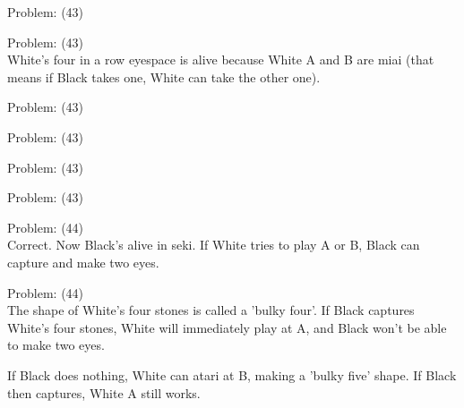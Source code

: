 \documentclass[11pt]{article}
\begin{document}
\begin{minipage}[t]{0.5\textwidth}
  {\centering
  
Problem: (43)\\
  }
\end{minipage}
\begin{minipage}[t]{0.5\textwidth}
  {\centering
  
Problem: (43)\\
White's four in a row eyespace is alive because White A and B are miai (that means if Black takes one, White can take the other one).\\
  }
\end{minipage}
\begin{minipage}[t]{0.5\textwidth}
  {\centering
  
Problem: (43)\\
  }
\end{minipage}
\begin{minipage}[t]{0.5\textwidth}
  {\centering
  
Problem: (43)\\
  }
\end{minipage}
\begin{minipage}[t]{0.5\textwidth}
  {\centering
  
Problem: (43)\\
  }
\end{minipage}
\begin{minipage}[t]{0.5\textwidth}
  {\centering
  
Problem: (43)\\
  }
\end{minipage}
\begin{minipage}[t]{0.5\textwidth}
  {\centering
  
Problem: (44)\\
Correct. Now Black's alive in seki. If White tries to play A or B, Black can capture and make two eyes.\\
  }
\end{minipage}
\begin{minipage}[t]{0.5\textwidth}
  {\centering
  
Problem: (44)\\
The shape of White's four stones is called a 'bulky four'. If Black captures White's four stones, White will immediately play at A, and Black won't be able to make two eyes.

If Black does nothing, White can atari at B, making a 'bulky five' shape. If Black then captures, White A still works.\\
  }
\end{minipage}
\end{document}
